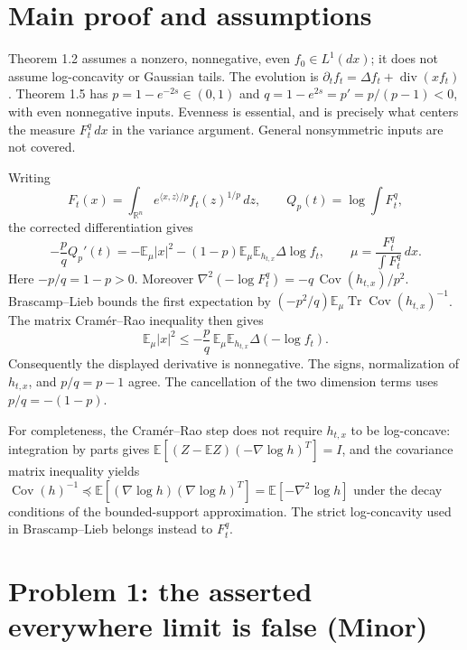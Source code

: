 \documentclass[10pt]{article}
\begin{document}
\section*{Main proof and assumptions}
Theorem 1.2 assumes a nonzero, nonnegative, even \(f_0\in L^1(dx)\); it does not assume log-concavity or Gaussian tails. The evolution is \(\partial_t f_t=\Delta f_t+\operatorname{div}(xf_t)\). Theorem 1.5 has \(p=1-e^{-2s}\in(0,1)\) and \(q=1-e^{2s}=p'=p/(p-1)<0\), with even nonnegative inputs. Evenness is essential, and is precisely what centers the measure \(F_t^q\,dx\) in the variance argument. General nonsymmetric inputs are not covered.\par
Writing \[F_t(x)=\int_{\mathbb R^n}e^{\langle x,z\rangle/p}f_t(z)^{1/p}\,dz,
 \qquad Q_p(t)=\log\int F_t^q,\] the corrected differentiation gives \[-\frac pq Q_p'(t)
 =-\mathbb E_\mu|x|^2
   -(1-p)\mathbb E_\mu\mathbb E_{h_{t,x}}\Delta\log f_t,
 \qquad \mu=\frac{F_t^q}{\int F_t^q}\,dx .\] Here \(-p/q=1-p>0\). Moreover \(\nabla^2(-\log F_t^q)=-q\,\operatorname{Cov}(h_{t,x})/p^2\). Brascamp–Lieb bounds the first expectation by \((-p^2/q)\mathbb E_\mu\operatorname{Tr}\operatorname{Cov}(h_{t,x})^{-1}\). The matrix Cramér–Rao inequality then gives \[\mathbb E_\mu|x|^2
 \leq -\frac pq\,\mathbb E_\mu\mathbb E_{h_{t,x}}
                    \Delta(-\log f_t).\] Consequently the displayed derivative is nonnegative. The signs, normalization of \(h_{t,x}\), and \(p/q=p-1\) agree. The cancellation of the two dimension terms uses \(p/q=-(1-p)\).\par
For completeness, the Cramér–Rao step does not require \(h_{t,x}\) to be log-concave: integration by parts gives \(\mathbb E[(Z-\mathbb EZ)(-\nabla\log h)^T]=I\), and the covariance matrix inequality yields \(\operatorname{Cov}(h)^{-1}\preceq
\mathbb E[(\nabla\log h)(\nabla\log h)^T]
=\mathbb E[-\nabla^2\log h]\) under the decay conditions of the bounded-support approximation. The strict log-concavity used in Brascamp–Lieb belongs instead to \(F_t^q\).\par
\section*{Problem 1: the asserted everywhere limit is false (Minor)}
\end{document}
